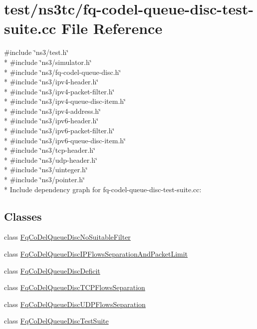 \hypertarget{fq-codel-queue-disc-test-suite_8cc}{}\section{test/ns3tc/fq-\/codel-\/queue-\/disc-\/test-\/suite.cc File Reference}
\label{fq-codel-queue-disc-test-suite_8cc}
{\ttfamily \#include \char`\"{}ns3/test.\+h\char`\"{}}\\*
{\ttfamily \#include \char`\"{}ns3/simulator.\+h\char`\"{}}\\*
{\ttfamily \#include \char`\"{}ns3/fq-\/codel-\/queue-\/disc.\+h\char`\"{}}\\*
{\ttfamily \#include \char`\"{}ns3/ipv4-\/header.\+h\char`\"{}}\\*
{\ttfamily \#include \char`\"{}ns3/ipv4-\/packet-\/filter.\+h\char`\"{}}\\*
{\ttfamily \#include \char`\"{}ns3/ipv4-\/queue-\/disc-\/item.\+h\char`\"{}}\\*
{\ttfamily \#include \char`\"{}ns3/ipv4-\/address.\+h\char`\"{}}\\*
{\ttfamily \#include \char`\"{}ns3/ipv6-\/header.\+h\char`\"{}}\\*
{\ttfamily \#include \char`\"{}ns3/ipv6-\/packet-\/filter.\+h\char`\"{}}\\*
{\ttfamily \#include \char`\"{}ns3/ipv6-\/queue-\/disc-\/item.\+h\char`\"{}}\\*
{\ttfamily \#include \char`\"{}ns3/tcp-\/header.\+h\char`\"{}}\\*
{\ttfamily \#include \char`\"{}ns3/udp-\/header.\+h\char`\"{}}\\*
{\ttfamily \#include \char`\"{}ns3/uinteger.\+h\char`\"{}}\\*
{\ttfamily \#include \char`\"{}ns3/pointer.\+h\char`\"{}}\\*
Include dependency graph for fq-\/codel-\/queue-\/disc-\/test-\/suite.cc\+:
\subsection*{Classes}
\begin{DoxyCompactItemize}
\item 
class \hyperlink{classFqCoDelQueueDiscNoSuitableFilter}{Fq\+Co\+Del\+Queue\+Disc\+No\+Suitable\+Filter}
\item 
class \hyperlink{classFqCoDelQueueDiscIPFlowsSeparationAndPacketLimit}{Fq\+Co\+Del\+Queue\+Disc\+I\+P\+Flows\+Separation\+And\+Packet\+Limit}
\item 
class \hyperlink{classFqCoDelQueueDiscDeficit}{Fq\+Co\+Del\+Queue\+Disc\+Deficit}
\item 
class \hyperlink{classFqCoDelQueueDiscTCPFlowsSeparation}{Fq\+Co\+Del\+Queue\+Disc\+T\+C\+P\+Flows\+Separation}
\item 
class \hyperlink{classFqCoDelQueueDiscUDPFlowsSeparation}{Fq\+Co\+Del\+Queue\+Disc\+U\+D\+P\+Flows\+Separation}
\item 
class \hyperlink{classFqCoDelQueueDiscTestSuite}{Fq\+Co\+Del\+Queue\+Disc\+Test\+Suite}
\end{DoxyCompactItemize}
